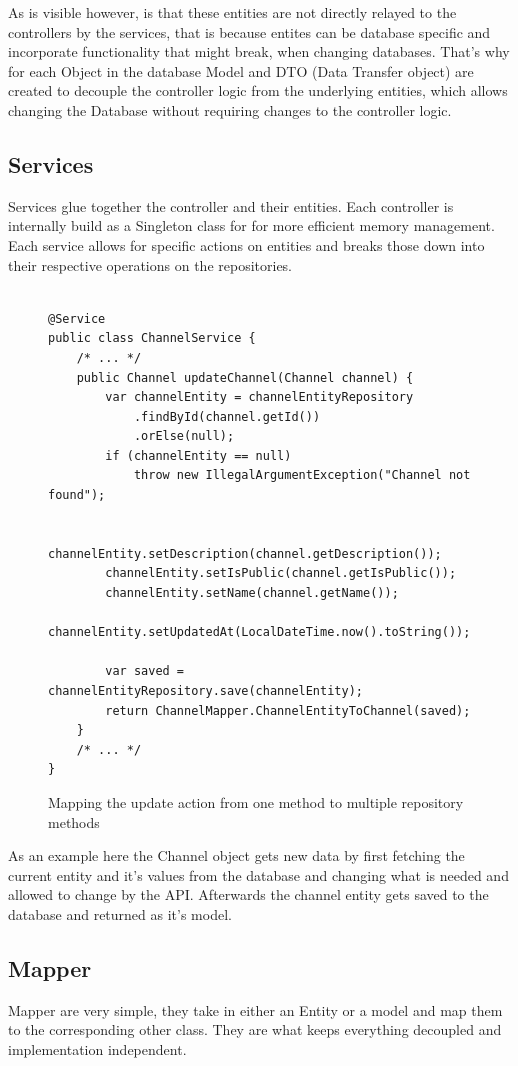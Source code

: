 \documentclass[a4paper,12pt]{article}
\begin{document}
	As is visible however, is that these entities are not directly relayed to the controllers by the services, that
	is because entites can be database specific and incorporate functionality that might break, when changing
	databases. That's why for each Object in the database Model and DTO (Data Transfer object) are created
	to decouple the controller logic from the underlying entities, which allows changing the Database without
	requiring changes to the controller logic.

	\subsection*{Services}
	Services glue together the controller and their entities. Each controller is internally build as a Singleton
	class for for more efficient memory management. Each service allows for specific actions on entities and breaks
	those down into their respective operations on the repositories.
	\begin{figure}[ht!]
		\begin{lstlisting}
			
@Service
public class ChannelService {
	/* ... */
	public Channel updateChannel(Channel channel) {
		var channelEntity = channelEntityRepository
			.findById(channel.getId())
			.orElse(null);
		if (channelEntity == null) 
			throw new IllegalArgumentException("Channel not found");

		channelEntity.setDescription(channel.getDescription());
		channelEntity.setIsPublic(channel.getIsPublic());
		channelEntity.setName(channel.getName());
		channelEntity.setUpdatedAt(LocalDateTime.now().toString());

		var saved = channelEntityRepository.save(channelEntity);
		return ChannelMapper.ChannelEntityToChannel(saved);
	}
	/* ... */
}
		\end{lstlisting}
		\caption{Mapping the update action from one method to multiple repository methods}
	\end{figure}
	As an example here the Channel object gets new data by first fetching the current entity and it's values from 
	the database and changing what is needed and allowed to change by the API. Afterwards the channel entity gets
	saved to the database and returned as it's model.
	\subsection*{Mapper}
	Mapper are very simple, they take in either an Entity or a model and map them to the corresponding other class.
	They are what keeps everything decoupled and implementation independent.
\end{document}
